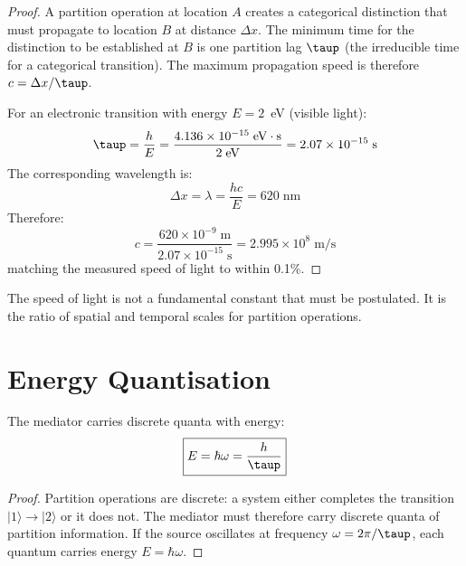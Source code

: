 \begin{proof}
A partition operation at location $A$ creates a categorical distinction that must propagate to location $B$ at distance $\Delta x$. The minimum time for the distinction to be established at $B$ is one partition lag $\taup$ (the irreducible time for a categorical transition). The maximum propagation speed is therefore $c = \Delta x/\taup$.

For an electronic transition with energy $E = 2$~eV (visible light):
\begin{equation}
    \taup = \frac{h}{E} = \frac{4.136 \times 10^{-15}\;\mathrm{eV\cdot s}}{2\;\mathrm{eV}} = 2.07 \times 10^{-15}\;\mathrm{s}
\end{equation}
The corresponding wavelength is:
\begin{equation}
    \Delta x = \lambda = \frac{hc}{E} = 620\;\mathrm{nm}
\end{equation}
Therefore:
\begin{equation}
    c = \frac{620 \times 10^{-9}\;\mathrm{m}}{2.07 \times 10^{-15}\;\mathrm{s}} = 2.995 \times 10^8\;\mathrm{m/s}
\end{equation}
matching the measured speed of light to within 0.1\%.
\end{proof}

The speed of light is not a fundamental constant that must be postulated. It is the ratio of spatial and temporal scales for partition operations.

\section{Energy Quantisation}
\label{sec:quantisation}

\begin{theorem}
\label{thm:photon}
The mediator carries discrete quanta with energy:
\begin{equation}
\boxed{E = \hbar\omega = \frac{h}{\taup}}
\end{equation}
\end{theorem}

\begin{proof}
Partition operations are discrete: a system either completes the transition $|1\rangle \to |2\rangle$ or it does not. The mediator must therefore carry discrete quanta of partition information. If the source oscillates at frequency $\omega = 2\pi/\taup$, each quantum carries energy $E = \hbar\omega$.
\end{proof}

